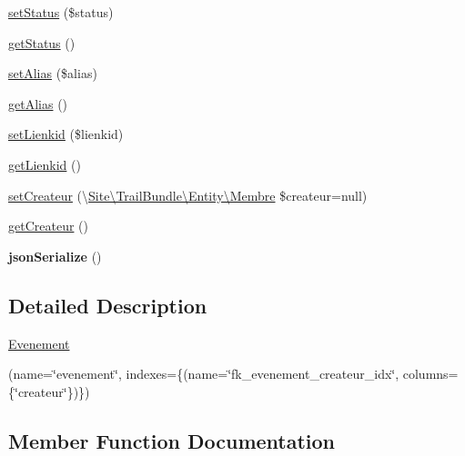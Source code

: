 \begin{DoxyCompactItemize}
\hyperlink{class_site_1_1_trail_bundle_1_1_entity_1_1_evenement_a7d02c100d684fe1dffc6cb3486a48511}{set\+Status} (\$status)
\item 
\hyperlink{class_site_1_1_trail_bundle_1_1_entity_1_1_evenement_a9d21636071f529e2154051d3ea6e5921}{get\+Status} ()
\item 
\hyperlink{class_site_1_1_trail_bundle_1_1_entity_1_1_evenement_ae8f7f6255cdb78df6e0f290d876c1dce}{set\+Alias} (\$alias)
\item 
\hyperlink{class_site_1_1_trail_bundle_1_1_entity_1_1_evenement_a26e3e0c627051b4287204b3575b81d97}{get\+Alias} ()
\item 
\hyperlink{class_site_1_1_trail_bundle_1_1_entity_1_1_evenement_a193e0a3c55733618f3ab7952df2967f4}{set\+Lienkid} (\$lienkid)
\item 
\hyperlink{class_site_1_1_trail_bundle_1_1_entity_1_1_evenement_a9834772f8ecb0f83a28fd8005be9359b}{get\+Lienkid} ()
\item 
\hyperlink{class_site_1_1_trail_bundle_1_1_entity_1_1_evenement_a81da8e8e05cd0d093f79a37ba4d4f439}{set\+Createur} (\textbackslash{}\hyperlink{class_site_1_1_trail_bundle_1_1_entity_1_1_membre}{Site\textbackslash{}\+Trail\+Bundle\textbackslash{}\+Entity\textbackslash{}\+Membre} \$createur=null)
\item 
\hyperlink{class_site_1_1_trail_bundle_1_1_entity_1_1_evenement_a66bfe1d4b6ee062ccb898f0bafa1672b}{get\+Createur} ()
\item 
\hypertarget{class_site_1_1_trail_bundle_1_1_entity_1_1_evenement_ad402d8679325bc514874370f02b5c2ac}{}{\bfseries json\+Serialize} ()\label{class_site_1_1_trail_bundle_1_1_entity_1_1_evenement_ad402d8679325bc514874370f02b5c2ac}

\end{DoxyCompactItemize}


\subsection{Detailed Description}
\hyperlink{class_site_1_1_trail_bundle_1_1_entity_1_1_evenement}{Evenement}

(name=\char`\"{}evenement\char`\"{}, indexes=\{(name=\char`\"{}fk\+\_\+evenement\+\_\+createur\+\_\+idx\char`\"{}, columns=\{\char`\"{}createur\char`\"{}\})\})  

\subsection{Member Function Documentation}
\hypertarget{class_site_1_1_trail_bundle_1_1_entity_1_1_evenement_a26e3e0c627051b4287204b3575b81d97}{}

